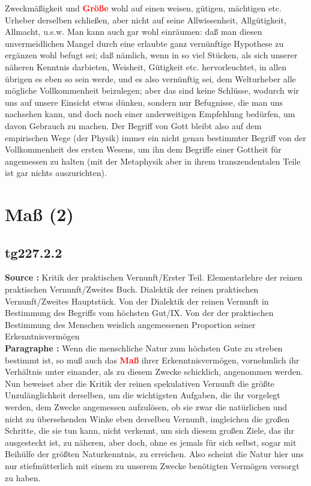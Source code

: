 \documentclass[a4paper,12pt,twoside]{book}
\newcommand{\match}[1]{\textcolor{red}{\textbf{#1}}}
\newcommand{\unnumberedsection}[1]{
	\section*{#1}
	\addcontentsline{toc}{section}{#1}
	\markright{#1}
}
\begin{document}
Zweckmäßigkeit und \match{Größe} wohl auf einen weisen, gütigen, mächtigen etc. Urheber derselben schließen, aber nicht auf seine Allwissenheit, Allgütigkeit, Allmacht, u.s.w. Man kann auch gar wohl einräumen: daß man diesen unvermeidlichen Mangel durch eine erlaubte ganz vernünftige Hypothese zu ergänzen wohl befugt sei; daß nämlich, wenn in so viel Stücken, als sich unserer näheren Kenntnis darbieten, Weisheit, Gütigkeit etc. hervorleuchtet, in allen übrigen es eben so sein werde, und es also vernünftig sei, dem Welturheber alle mögliche Vollkommenheit beizulegen; aber das sind keine Schlüsse, wodurch wir uns auf unsere Einsicht etwas dünken, sondern nur Befugnisse, die man uns nachsehen kann, und doch noch einer anderweitigen Empfehlung bedürfen, um davon Gebrauch zu machen. Der Begriff von Gott bleibt also auf dem empirischen Wege (der Physik) immer ein nicht genau bestimmter Begriff von der Vollkommenheit des ersten Wesens, um ihn dem Begriffe einer Gottheit für angemessen zu halten (mit der Metaphysik aber in ihrem transzendentalen Teile ist gar nichts auszurichten). 
	
	\unnumberedsection{Maß (2)} 
	\subsection*{tg227.2.2} 
	\textbf{Source : }Kritik der praktischen Vernunft/Erster Teil. Elementarlehre der reinen praktischen Vernunft/Zweites Buch. Dialektik der reinen praktischen Vernunft/Zweites Hauptstück. Von der Dialektik der reinen Vernunft in Bestimmung des Begriffs vom höchsten Gut/IX. Von der der praktischen Bestimmung des Menschen weislich angemessenen Proportion seiner Erkenntnisvermögen\\  
	
	\noindent\textbf{Paragraphe : }Wenn die menschliche Natur zum höchsten Gute zu streben bestimmt ist, so muß auch das \match{Maß} ihrer Erkenntnisvermögen, vornehmlich ihr Verhältnis unter einander, als zu diesem Zwecke schicklich, angenommen werden. Nun beweiset aber die Kritik der reinen spekulativen Vernunft die größte Unzulänglichkeit derselben, um die wichtigsten Aufgaben, die ihr vorgelegt werden, dem Zwecke angemessen aufzulösen, ob sie zwar die natürlichen und nicht zu übersehenden Winke eben derselben Vernunft, imgleichen die großen Schritte, die sie tun kann, nicht verkennt, um sich diesem großen Ziele, das ihr ausgesteckt ist, zu näheren, aber doch, ohne es jemals für sich selbst, sogar mit Beihülfe der größten Naturkenntnis, zu erreichen. Also scheint die Natur hier uns nur stiefmütterlich mit einem zu unserem Zwecke benötigten Vermögen versorgt zu haben. 
	
\end{document}
